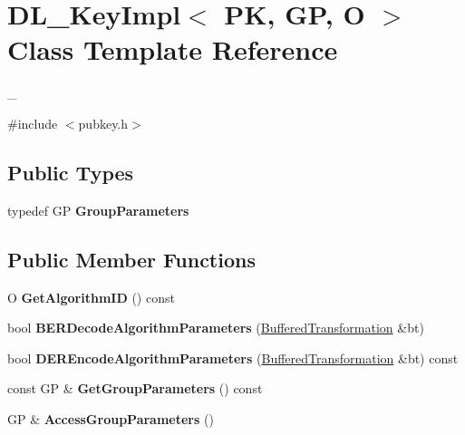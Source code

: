 \hypertarget{class_d_l___key_impl}{
\section{DL\_\-KeyImpl$<$ PK, GP, O $>$ Class Template Reference}
\label{class_d_l___key_impl}
}


\_\-  


{\ttfamily \#include $<$pubkey.h$>$}\subsection*{Public Types}
\begin{DoxyCompactItemize}
\item 
\hypertarget{class_d_l___key_impl_ab79562fe76880b7eb21c9f926a3161f2}{
typedef GP {\bfseries GroupParameters}}
\label{class_d_l___key_impl_ab79562fe76880b7eb21c9f926a3161f2}

\end{DoxyCompactItemize}
\subsection*{Public Member Functions}
\begin{DoxyCompactItemize}
\item 
\hypertarget{class_d_l___key_impl_aef61780b861b66783ae7cd8101b0dc0d}{
O {\bfseries GetAlgorithmID} () const }
\label{class_d_l___key_impl_aef61780b861b66783ae7cd8101b0dc0d}

\item 
\hypertarget{class_d_l___key_impl_a25b475d09a1217fa4f64369e76346e57}{
bool {\bfseries BERDecodeAlgorithmParameters} (\hyperlink{class_buffered_transformation}{BufferedTransformation} \&bt)}
\label{class_d_l___key_impl_a25b475d09a1217fa4f64369e76346e57}

\item 
\hypertarget{class_d_l___key_impl_a9816c273e07c1c33811a7866188baac9}{
bool {\bfseries DEREncodeAlgorithmParameters} (\hyperlink{class_buffered_transformation}{BufferedTransformation} \&bt) const }
\label{class_d_l___key_impl_a9816c273e07c1c33811a7866188baac9}

\item 
\hypertarget{class_d_l___key_impl_a95d234a934282081268cfb46c27fb1f7}{
const GP \& {\bfseries GetGroupParameters} () const }
\label{class_d_l___key_impl_a95d234a934282081268cfb46c27fb1f7}

\item 
\hypertarget{class_d_l___key_impl_a2ec144a5bedd2151b4bd0bb5118f1a8f}{
GP \& {\bfseries AccessGroupParameters} ()}
\label{class_d_l___key_impl_a2ec144a5bedd2151b4bd0bb5118f1a8f}

\end{DoxyCompactItemize}


